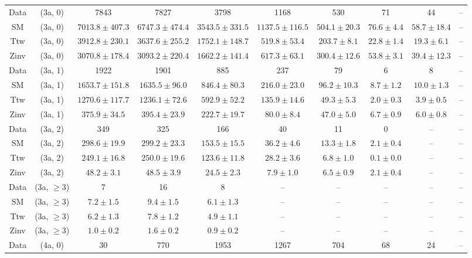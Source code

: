 \begin{table}[h!]
{\begin{tabular}{cccccccccc}
	Data & (3a, 0) & 7843 & 7827 & 3798 & 1168 & 530 & 71 & 44 & -- \\[0.5ex] 
	SM & (3a, 0) & $7013.8\pm 407.3$ & $6747.3\pm 474.4$ & $3543.5\pm 331.5$ & $1137.5\pm 116.5$ & $504.1\pm 20.3$ & $76.6\pm 4.4$ & $58.7\pm 18.4$ & -- \\[0.5ex] 
	Ttw & (3a, 0) & $3912.8\pm 230.1$ & $3637.6\pm 255.2$ & $1752.1\pm 148.7$ & $519.8\pm 53.4$ & $203.7\pm 8.1$ & $22.8\pm 1.4$ & $19.3\pm 6.1$ & -- \\[0.5ex] 
	Zinv & (3a, 0) & $3070.8\pm 178.4$ & $3093.2\pm 220.4$ & $1662.2\pm 141.4$ & $617.3\pm 63.1$ & $300.4\pm 12.6$ & $53.8\pm 3.1$ & $39.4\pm 12.3$ & -- \\[0.5ex] 
	Data & (3a, 1) & 1922 & 1901 & 885 & 237 & 79 & 6 & 8 & -- \\[0.5ex] 
	SM & (3a, 1) & $1653.7\pm 151.8$ & $1635.5\pm 96.0$ & $846.4\pm 80.3$ & $216.0\pm 23.0$ & $96.2\pm 10.3$ & $8.7\pm 1.2$ & $10.0\pm 1.3$ & -- \\[0.5ex] 
	Ttw & (3a, 1) & $1270.6\pm 117.7$ & $1236.1\pm 72.6$ & $592.9\pm 52.2$ & $135.9\pm 14.6$ & $49.3\pm 5.3$ & $2.0\pm 0.3$ & $3.9\pm 0.5$ & -- \\[0.5ex] 
	Zinv & (3a, 1) & $375.9\pm 34.5$ & $395.4\pm 23.9$ & $222.7\pm 19.7$ & $80.0\pm 8.4$ & $47.0\pm 5.0$ & $6.7\pm 0.9$ & $6.0\pm 0.8$ & -- \\[0.5ex] 
	Data & (3a, 2) & 349 & 325 & 166 & 40 & 11 & 0 & -- & -- \\[0.5ex] 
	SM & (3a, 2) & $298.6\pm 19.9$ & $299.2\pm 23.3$ & $153.5\pm 15.5$ & $36.2\pm 4.6$ & $13.3\pm 1.8$ & $2.1\pm 0.4$ & -- & -- \\[0.5ex] 
	Ttw & (3a, 2) & $249.1\pm 16.8$ & $250.0\pm 19.6$ & $123.6\pm 11.8$ & $28.2\pm 3.6$ & $6.8\pm 1.0$ & $0.1\pm 0.0$ & -- & -- \\[0.5ex] 
	Zinv & (3a, 2) & $48.2\pm 3.1$ & $48.5\pm 3.9$ & $24.5\pm 2.3$ & $7.9\pm 1.0$ & $6.5\pm 0.9$ & $2.1\pm 0.4$ & -- & -- \\[0.5ex] 
	Data & (3a, $\ge3$) & 7 & 16 & 8 & -- & -- & -- & -- & -- \\[0.5ex] 
	SM & (3a, $\ge3$) & $7.2\pm 1.5$ & $9.4\pm 1.5$ & $6.1\pm 1.3$ & -- & -- & -- & -- & -- \\[0.5ex] 
	Ttw & (3a, $\ge3$) & $6.2\pm 1.3$ & $7.8\pm 1.2$ & $4.9\pm 1.1$ & -- & -- & -- & -- & -- \\[0.5ex] 
	Zinv & (3a, $\ge3$) & $1.0\pm 0.2$ & $1.6\pm 0.2$ & $0.9\pm 0.2$ & -- & -- & -- & -- & -- \\[0.5ex] 
	Data & (4a, 0) & 30 & 770 & 1953 & 1267 & 704 & 68 & 24 & -- \\[0.5ex] 

\end{tabular}}
\end{table}
